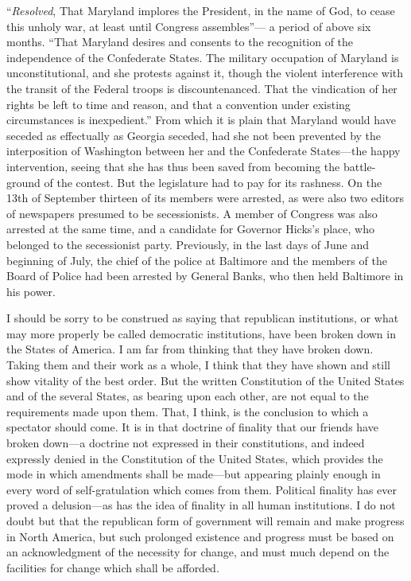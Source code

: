 ``\emph{Resolved}, That Maryland implores the President, in the name of
God, to cease this unholy war, at least until Congress assembles''---%
a period of above six months.  ``That Maryland desires and consents
to the recognition of the independence of the Confederate States.
The military occupation of Maryland is unconstitutional, and she
protests against it, though the violent interference with the
transit of the Federal troops is discountenanced.  That the
vindication of her rights be left to time and reason, and that a
convention under existing circumstances is inexpedient.''  From
which it is plain that Maryland would have seceded as effectually
as Georgia seceded, had she not been prevented by the interposition
of Washington between her and the Confederate States---the happy
intervention, seeing that she has thus been saved from becoming the
battle-ground of the contest.  But the legislature had to pay for
its rashness.  On the 13th of September thirteen of its members
were arrested, as were also two editors of newspapers presumed to
be secessionists.  A member of Congress was also arrested at the
same time, and a candidate for Governor Hicks's place, who belonged
to the secessionist party.  Previously, in the last days of June
and beginning of July, the chief of the police at Baltimore and the
members of the Board of Police had been arrested by General Banks,
who then held Baltimore in his power.

I should be sorry to be construed as saying that republican
institutions, or what may more properly be called democratic
institutions, have been broken down in the States of America.  I am
far from thinking that they have broken down.  Taking them and
their work as a whole, I think that they have shown and still show
vitality of the best order.  But the written Constitution of the
United States and of the several States, as bearing upon each
other, are not equal to the requirements made upon them.  That, I
think, is the conclusion to which a spectator should come.  It is
in that doctrine of finality that our friends have broken down---a
doctrine not expressed in their constitutions, and indeed expressly
denied in the Constitution of the United States, which provides the
mode in which amendments shall be made---but appearing plainly
enough in every word of self-gratulation which comes from them.
Political finality has ever proved a delusion---as has the idea of
finality in all human institutions.  I do not doubt but that the
republican form of government will remain and make progress in
North America, but such prolonged existence and progress must be
based on an acknowledgment of the necessity for change, and must
much depend on the facilities for change which shall be afforded.

